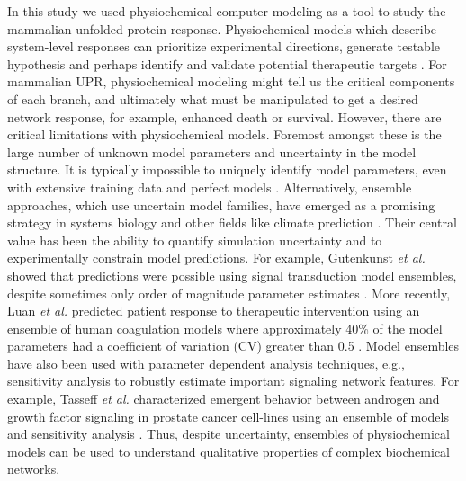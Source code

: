 \documentclass[12pt]{article}
\begin{document}
In this study we used physiochemical computer modeling as a tool to study the mammalian unfolded protein response. Physiochemical models which describe system-level responses can prioritize experimental directions, generate testable hypothesis and perhaps identify and validate potential therapeutic targets \cite{KITANO2007}. For mammalian UPR, physiochemical modeling might tell us the critical components of each branch, and ultimately what must be manipulated to get a desired network response, for example, enhanced death or survival. However, there are critical limitations with physiochemical models. Foremost amongst these is the large number of unknown model parameters and uncertainty in the model structure. It is typically impossible to uniquely identify model parameters, even with extensive training data and perfect models \cite{Gadkar:2005ad}. Alternatively, ensemble approaches, which use uncertain model families, have emerged as a promising strategy in systems biology and other fields like climate prediction \cite{Battogtokh:2002uq,Kuepfer:2007,Brown:2003qy,Palmer:2005,Song:2009uq}. Their central value has been the ability to quantify simulation uncertainty and to experimentally constrain model predictions. For example, Gutenkunst \emph{et al.} showed that predictions were possible using signal transduction model ensembles, despite sometimes only order of magnitude parameter estimates \cite{Gutenkunst:2007oq}. More recently, Luan \emph{et al.} predicted patient response to therapeutic intervention using an ensemble of human coagulation models where approximately 40\% of the model parameters had a coefficient of variation (CV) greater than 0.5 \cite{Luan:2010fc}. Model ensembles have also been used with parameter dependent analysis techniques, e.g., sensitivity analysis to robustly estimate important signaling network features. For example, Tasseff \emph{et al.} characterized emergent behavior between androgen and growth factor signaling in prostate cancer cell-lines using an ensemble of models and sensitivity analysis \cite{Tasseff:2010rq}. Thus, despite uncertainty, ensembles of physiochemical models can be used to understand qualitative properties of complex biochemical networks. 
\end{document}
